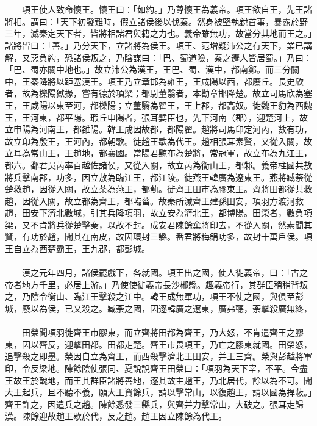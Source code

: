 \\\\
　　項王使人致命懷王。懷王曰：「如約。」乃尊懷王為義帝。項王欲自王，先王諸將相。謂曰：「天下初發難時，假立諸侯後以伐秦。然身被堅執銳首事，暴露於野三年，滅秦定天下者，皆將相諸君與籍之力也。義帝雖無功，故當分其地而王之。」諸將皆曰：「善。」乃分天下，立諸將為侯王。項王、范增疑沛公之有天下，業已講解，又惡負約，恐諸侯叛之，乃陰謀曰：「巴、蜀道險，秦之遷人皆居蜀。」乃曰：「巴、蜀亦關中地也。」故立沛公為漢王，王巴、蜀、漢中，都南鄭。而三分關中，王秦降將以距塞漢王。項王乃立章邯為雍王，王咸陽以西，都廢丘。長史欣者，故為櫟陽獄掾，嘗有德於項梁；都尉董翳者，本勸章邯降楚。故立司馬欣為塞王，王咸陽以東至河，都櫟陽；立董翳為翟王，王上郡，都高奴。徙魏王豹為西魏王，王河東，都平陽。瑕丘申陽者，張耳嬖臣也，先下河南（郡），迎楚河上，故立申陽為河南王，都雒陽。韓王成因故都，都陽翟。趙將司馬卬定河內，數有功，故立卬為殷王，王河內，都朝歌。徙趙王歇為代王。趙相張耳素賢，又從入關，故立耳為常山王，王趙地，都襄國。當陽君黥布為楚將，常冠軍，故立布為九江王，都六。鄱君吳芮率百越佐諸侯，又從入關，故立芮為衡山王，都邾。義帝柱國共敖將兵擊南郡，功多，因立敖為臨江王，都江陵。徙燕王韓廣為遼東王。燕將臧荼從楚救趙，因從入關，故立荼為燕王，都薊。徙齊王田市為膠東王。齊將田都從共救趙，因從入關，故立都為齊王，都臨菑。故秦所滅齊王建孫田安，項羽方渡河救趙，田安下濟北數城，引其兵降項羽，故立安為濟北王，都博陽。田榮者，數負項梁，又不肯將兵從楚擊秦，以故不封。成安君陳餘棄將印去，不從入關，然素聞其賢，有功於趙，聞其在南皮，故因環封三縣。番君將梅鋗功多，故封十萬戶侯。項王自立為西楚霸王，王九郡，都彭城。
\\\\
　　漢之元年四月，諸侯罷戲下，各就國。項王出之國，使人徙義帝，曰：「古之帝者地方千里，必居上游。」乃使使徙義帝長沙郴縣。趣義帝行，其群臣稍稍背叛之，乃陰令衡山、臨江王擊殺之江中。韓王成無軍功，項王不使之國，與俱至彭城，廢以為侯，已又殺之。臧荼之國，因逐韓廣之遼東，廣弗聽，荼擊殺廣無終，
\\\\
　　田榮聞項羽徙齊王市膠東，而立齊將田都為齊王，乃大怒，不肯遣齊王之膠東，因以齊反，迎擊田都。田都走楚。齊王市畏項王，乃亡之膠東就國。田榮怒，追擊殺之即墨。榮因自立為齊王，而西殺擊濟北王田安，并王三齊。榮與彭越將軍印，令反梁地。陳餘陰使張同、夏說說齊王田榮曰：「項羽為天下宰，不平。今盡王故王於醜地，而王其群臣諸將善地，逐其故主趙王，乃北居代，餘以為不可。聞大王起兵，且不聽不義，願大王資餘兵，請以擊常山，以復趙王，請以國為捍蔽。」齊王許之，因遣兵之趙。陳餘悉發三縣兵，與齊并力擊常山，大破之。張耳走歸漢。陳餘迎故趙王歇於代，反之趙。趙王因立陳餘為代王。
\\\\

